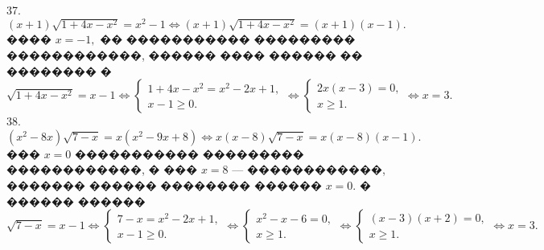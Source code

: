 \documentclass[12pt]{article}
\begin{document}
37. $(x+1)\sqrt{1+4x-x^2}=x^2-1\Leftrightarrow (x+1)\sqrt{1+4x-x^2}=(x+1)(x-1).$ ���� $x=-1,$ �� ����������� ��������� ������������, ������ ���� ������ �� �������� � $\sqrt{1+4x-x^2}=x-1\Leftrightarrow\begin{cases}1+4x-x^2=x^2-2x+1,\\ x-1\geqslant0.\end{cases}
\Leftrightarrow\begin{cases}2x(x-3)=0,\\ x\geqslant1.\end{cases}\Leftrightarrow
x=3.$\\
38. $(x^2-8x)\sqrt{7-x}=x(x^2-9x+8)\Leftrightarrow x(x-8)\sqrt{7-x}=x(x-8)(x-1).$ ��� $x=0$ ����������� ��������� ������������, � ��� $x=8$ --- ������������, ������� ������ �������� ������ $x=0.$ � ������ ������ $\sqrt{7-x}=x-1\Leftrightarrow \begin{cases} 7-x=x^2-2x+1,\\ x-1\geqslant0.\end{cases}
\Leftrightarrow \begin{cases} x^2-x-6=0,\\ x\geqslant1.\end{cases}
\Leftrightarrow \begin{cases} (x-3)(x+2)=0,\\ x\geqslant1.\end{cases}\Leftrightarrow x=3.$
\end{document}
